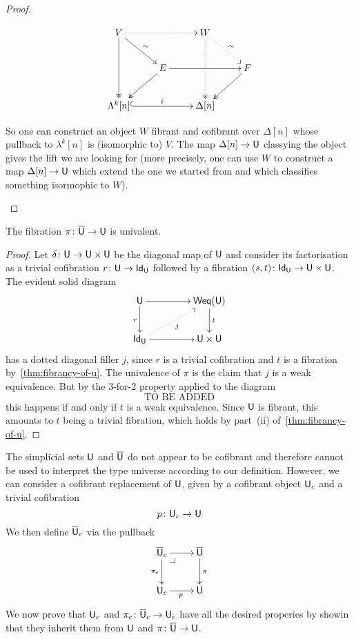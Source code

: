 \documentclass[reqno,10pt,a4paper,oneside,draft]{amsart}
\begin{document}
\begin{proof}
\begin{enumerate}[(i)]
\[ 
\xymatrix{
  V
  \ar@{.>}[rr]
  \ar[dr]^{\sim}
  \ar@{->>}[dd]
&&
  W
  \ar@{.>}[dr]^{\sim}
  \ar@{.>>}[dd]|{\hole}
&\\&
  E
  \ar[rr]
  \ar@{->>}[dl]
&&
  F
  \ar@{->>}[dl]
\\
  \Lambda^k[n]
  \ar@{^{(}->}[rr]^i
&&
  \Delta[n]
&
}
\] 


So one can construct an object $W$ fibrant and cofibrant over $\Delta[n]$ whose pullback to $\lambda^k[n]$ is (isomorphic to) $V$. The map $\Delta[n] \rightarrow \mathsf{U}$ classying the object gives the lift we are looking for (more precisely, one can use $W$ to construct  a map $\Delta[n] \rightarrow \mathsf{U}$ which extend the one we started from and which classifies something isormophic to $W$). \qedhere
\end{enumerate}
\end{proof}



\begin{corollary} The fibration $\pi \colon \overline{\mathsf{U}} \to \mathsf{U}$ is univalent.
\end{corollary}

\begin{proof} Let $\delta \colon \mathsf{U} \to \mathsf{U} \times \mathsf{U}$ be the diagonal map of $\mathsf{U}$ and consider its factorisation
as a trivial cofibration $r \colon \mathsf{U} \to \mathsf{Id}_{\mathsf{U}}$ followed by a fibration $(s,t) \colon \mathsf{Id}_{\mathsf{U}} \to \mathsf{U} \times \mathsf{U}$. The evident solid diagram
\[
\xymatrix@C=1.5cm{
\U \ar[r] \ar[d]_r & \Weq(\U) \ar[d]^{t} \\
\mathsf{Id}_\U \ar[r]  \ar@{.>}[ur]_{j} &  \U \times \U }
\]
has a dotted diagonal filler $j$, since $r$ is a trivial cofibration and $t$ is a fibration by~\cref{thm:fibrancy-of-u}. The univalence of $\pi$ is the claim that $j$ is a weak equivalence. But by the 3-for-2 property applied to the diagram
\[
\text{TO BE ADDED}
\]
this happens if and only if $t$ is a weak equivalence. Since $\mathsf{U}$ is fibrant, this amounts to $t$ being a trivial
fibration, which holds by part~(ii) of~\cref{thm:fibrancy-of-u}. 
\end{proof} 


\bigskip


The simplicial sets $\mathsf{U}$ and $\overline{\mathsf{U}}$ do not appear to be cofibrant and therefore cannot be used to interpret the type universe according to our definition. However, we can consider a cofibrant replacement of $\mathsf{U}$, given by a cofibrant object $\mathsf{U}_c$ and a trivial cofibration
\begin{equation}
\label{equ:ucu}
p \colon \mathsf{U}_c \rightarrow \mathsf{U}
\end{equation}
We then define $\overline{\mathsf{U}}_c$ via the pullback
\[
\xymatrix{
\UU_c \ar[d]_{\pi_c} \ar[r] \drpullback & \UU \ar[d]^{\pi}  \\
\U_c \ar[r]_p & \U}
\]
We now prove that $\mathsf{U}_c$ and $\pi_c \colon \overline{\mathsf{U}}_c \to \mathsf{U}_c$ have all the desired properies by showin that 
they inherit them from $\mathsf{U}$ and $\pi \colon \overline{\mathsf{U}} \to \mathsf{U}$.
\end{document}
